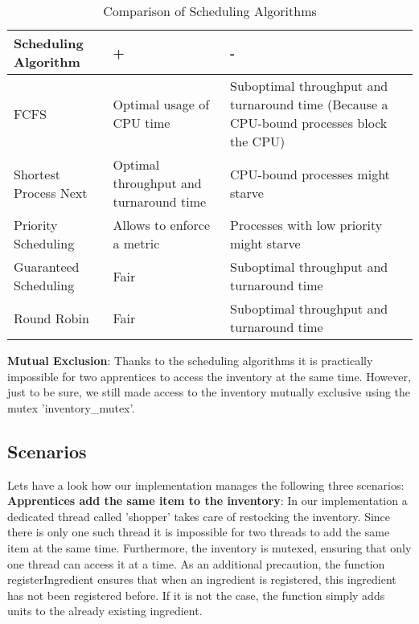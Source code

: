 \documentclass[11pt]{article}
\begin{document}
\begin{table}[htbp]
\caption{\label{fig:comparison}Comparison of Scheduling Algorithms}
\centering
\begin{tabular}{|p{5cm}|p{5cm}|p{7cm}|}
\hline
\textbf{Scheduling Algorithm} & \textbf{+} & \textbf{-}\\
\hline
FCFS & Optimal usage of CPU time & Suboptimal throughput and turnaround time (Because a CPU-bound processes block the CPU)\\
\hline
Shortest Process Next & Optimal throughput and turnaround time & CPU-bound processes might starve\\
\hline
Priority Scheduling & Allows to enforce a metric & Processes with low priority might starve\\
\hline
Guaranteed Scheduling & Fair & Suboptimal throughput and turnaround time\\
\hline
Round Robin & Fair & Suboptimal throughput and turnaround time\\
\hline
\end{tabular}
\end{table}

\textbf{Mutual Exclusion}: Thanks to the scheduling algorithms it is practically impossible for two apprentices to access the inventory at the same time. However, just to be sure, we still made access to the inventory mutually exclusive using the mutex 'inventory\_mutex'.\\

\subsection{Scenarios}
\label{sec:org3e31ec2}

Lets have a look how our implementation manages the following three scenarios:\\

\textbf{Apprentices add the same item to the inventory}: In our implementation a dedicated thread called 'shopper' takes care of restocking the inventory. Since there is only one such thread it is impossible for two threads to add the same item at the same time. Furthermore, the inventory is mutexed, ensuring that only one thread can access it at a time. As an additional precaution, the function registerIngredient ensures that when an ingredient is registered, this ingredient has not been registered before. If it is not the case, the function simply adds units to the already existing ingredient.\\
\end{document}
